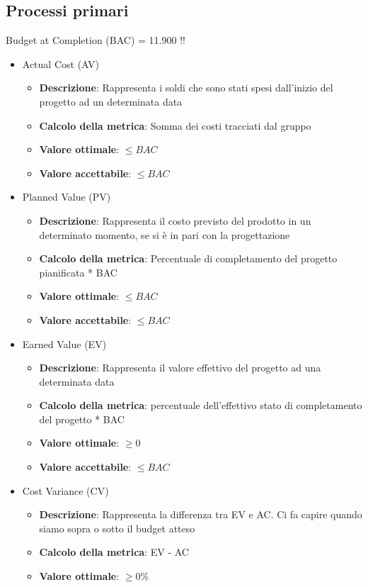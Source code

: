 \documentclass[12pt]{article}
\begin{document}
\subsection{Processi primari}
Budget at Completion (BAC) = 11.900 !!
\begin{itemize}
	\item Actual Cost (AV)
	\begin{itemize}
		\item \textbf{Descrizione}: Rappresenta i soldi che sono stati spesi dall'inizio del progetto ad un determinata data
		\item \textbf{Calcolo della metrica}: Somma dei costi tracciati dal gruppo
		\item \textbf{Valore ottimale}: $\le BAC$
		\item \textbf{Valore accettabile}: $\le BAC$
	\end{itemize}
	\item Planned Value (PV) 
	\begin{itemize}
		\item \textbf{Descrizione}: Rappresenta il costo previsto del prodotto in un determinato momento, se si è in pari con la progettazione
		\item \textbf{Calcolo della metrica}: Percentuale di completamento del progetto pianificata * BAC
		\item \textbf{Valore ottimale}: $\le BAC$
		\item \textbf{Valore accettabile}: $\le BAC$
	\end{itemize}
	\item Earned Value (EV)
	\begin{itemize}
		\item \textbf{Descrizione}: Rappresenta il valore effettivo del progetto ad una determinata data
		\item \textbf{Calcolo della metrica}: percentuale dell'effettivo stato di completamento del progetto * BAC 
		\item \textbf{Valore ottimale}: $\ge 0$ 
		\item \textbf{Valore accettabile}: $\le BAC$
	\end{itemize}
	\item Cost Variance (CV)
	\begin{itemize}
		\item \textbf{Descrizione}: Rappresenta la differenza tra EV e AC. Ci fa capire quando siamo sopra o sotto il budget atteso
		\item \textbf{Calcolo della metrica}:  EV - AC
		\item \textbf{Valore ottimale}: $\ge 0\%$

\end{itemize}
\end{itemize}
\end{document}
